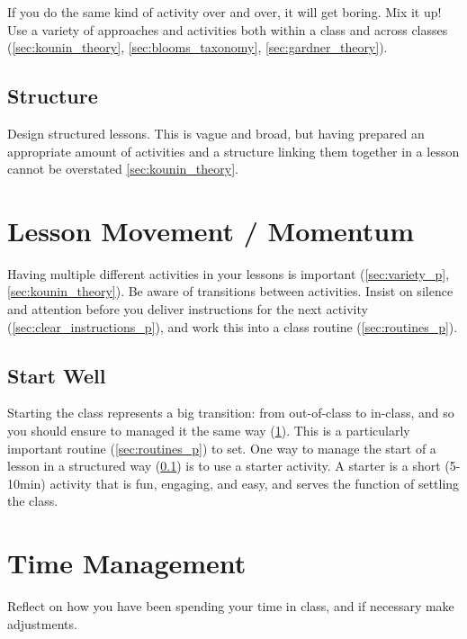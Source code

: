 \documentclass[12pt]{report}
\begin{document}
If you do the same kind of activity over and over, it will get boring. Mix it up! Use a variety of approaches and activities both within a class and across classes (\ref{sec:kounin_theory}, \ref{sec:blooms_taxonomy}, \ref{sec:gardner_theory}).

\subsection{Structure}
\label{sec:structure_p}

Design structured lessons. This is vague and broad, but having prepared an appropriate amount of activities and a structure linking them together in a lesson cannot be overstated \ref{sec:kounin_theory}.



\section{Lesson Movement / Momentum}
\label{sec:flow_p}

Having multiple different activities in your lessons is important (\ref{sec:variety_p}, \ref{sec:kounin_theory}). Be aware of transitions between activities. Insist on silence and attention before you deliver instructions for the next activity (\ref{sec:clear_instructions_p}), and work this into a class routine (\ref{sec:routines_p}).

\subsection{Start Well}
\label{sec:start_well_p}

Starting the class represents a big transition: from out-of-class to in-class, and so you should ensure to managed it the same way (\ref{sec:flow_p}). This is a particularly important routine (\ref{sec:routines_p}) to set. One way to manage the start of a lesson in a structured way (\ref{sec:structure_p}) is to use a starter activity. A starter is a short (5-10min) activity that is fun, engaging, and easy, and serves the function of settling the class.




\section{Time Management}
\label{sec:manage_your_time_p}

Reflect on how you have been spending your time in class, and if necessary make adjustments. 
\end{document}
